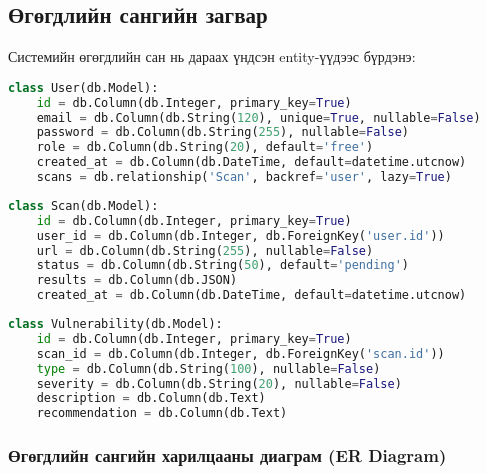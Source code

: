 \documentclass[main.tex]{subfiles}
\begin{document}
\subsection{Өгөгдлийн сангийн загвар}

Системийн өгөгдлийн сан нь дараах үндсэн entity-үүдээс бүрдэнэ:

\begin{lstlisting}[language=Python, caption=User модель]
class User(db.Model):
    id = db.Column(db.Integer, primary_key=True)
    email = db.Column(db.String(120), unique=True, nullable=False)
    password = db.Column(db.String(255), nullable=False)
    role = db.Column(db.String(20), default='free')
    created_at = db.Column(db.DateTime, default=datetime.utcnow)
    scans = db.relationship('Scan', backref='user', lazy=True)
\end{lstlisting}

\begin{lstlisting}[language=Python, caption=Scan модель]
class Scan(db.Model):
    id = db.Column(db.Integer, primary_key=True)
    user_id = db.Column(db.Integer, db.ForeignKey('user.id'))
    url = db.Column(db.String(255), nullable=False)
    status = db.Column(db.String(50), default='pending')
    results = db.Column(db.JSON)
    created_at = db.Column(db.DateTime, default=datetime.utcnow)
\end{lstlisting}

\begin{lstlisting}[language=Python, caption=Vulnerability модель]
class Vulnerability(db.Model):
    id = db.Column(db.Integer, primary_key=True)
    scan_id = db.Column(db.Integer, db.ForeignKey('scan.id'))
    type = db.Column(db.String(100), nullable=False)
    severity = db.Column(db.String(20), nullable=False)
    description = db.Column(db.Text)
    recommendation = db.Column(db.Text)
\end{lstlisting}

\subsubsection{Өгөгдлийн сангийн харилцааны диаграм (ER Diagram)}
\end{document}
